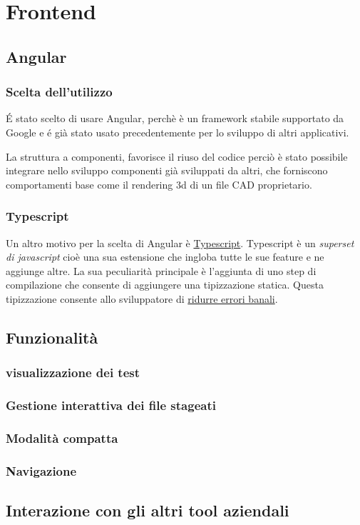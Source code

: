 \chapter{Frontend}
    \section{Angular}
        \subsection{Scelta dell'utilizzo}
            \'E stato scelto di usare Angular, perchè è un framework stabile supportato da Google
            e \'e già stato usato precedentemente per lo sviluppo di altri applicativi.
            
            La struttura a componenti, favorisce il riuso del codice perciò è stato possibile integrare
            nello sviluppo componenti già sviluppati da altri, che forniscono comportamenti base
            come il rendering 3d di un file CAD proprietario.
        
        \subsection{Typescript}
            Un altro motivo per la scelta di Angular è \href{https://www.typescriptlang.org}{Typescript}.
            Typescript è un \textit{superset di javascript} cioè una sua estensione che ingloba tutte le sue feature e ne aggiunge altre.
            La sua peculiarità principale è l'aggiunta di uno step di compilazione che consente di aggiungere una tipizzazione statica.
            Questa tipizzazione consente allo sviluppatore di
            \href{https://www.quora.com/Why-is-type-checking-important-in-programming-languages-and-how-should-one-choose-between-dynamically-and-statically-typed-languages}{ridurre errori banali}.
    \section{Funzionalità}
        \subsection{visualizzazione dei test}         
        \subsection{Gestione interattiva dei file stageati}         
        \subsection{Modalità compatta}
        \subsection{Navigazione}
    \section{Interazione con gli altri tool aziendali}
